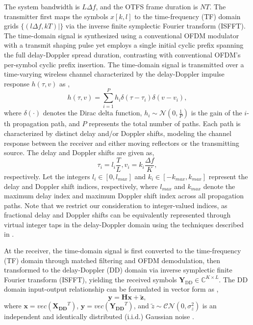 \documentclass{article}
\begin{document}
The system bandwidth is $L\Delta f$, and the OTFS frame duration is $NT$. The transmitter first maps the symbols $x[k,l]$ to the time-frequency (TF) domain grids $\{(l\Delta f, kT)|\}$ via the inverse finite symplectic Fourier transform (ISFFT). The time-domain signal is synthesized using a conventional OFDM modulator with a transmit shaping pulse yet employs a single initial cyclic prefix spanning the full delay-Doppler spread duration, contrasting with conventional OFDM's per-symbol cyclic prefix insertion. The time-domain signal is transmitted over a time-varying wireless channel characterized by the delay-Doppler impulse response $h(\tau, v)$ as \cite{7925924},
\begin{equation}
h(\tau, v) = \sum_{i=1}^P h_i \delta (\tau - {\tau}_i) \delta (v - v_i) ,
\end{equation}
where $\delta(\cdot)$ denotes the Dirac delta function, $h_i \sim \mathcal{N}(0, \frac{1}{P})$ is the gain of the $i$-th propagation path, and $P$ represents the total number of paths. Each path is characterized by distinct delay and/or Doppler shifts, modeling the channel response between the receiver and either moving reflectors or the transmitting source. The delay and Doppler shifts are given as,
\begin{equation}
{\tau}_i = l_i \frac{T}{L}, v_i = k_i \frac{\Delta f}{K},
\end{equation}
respectively. Let the integers $l_i \in [0, l_{max}]$ and $k_i \in [-k_{max}, k_{max}]$ represent the delay and Doppler shift indices, respectively, where $l_{max}$ and $k_{max}$ denote the maximum delay index and maximum Doppler shift index across all propagation paths. Note that we restrict our consideration to integer-valued indices, as fractional delay and Doppler shifts can be equivalently represented through virtual integer taps in the delay-Doppler domain using the techniques described in \cite{6563167, 8377159, 8516353}.

At the receiver, the time-domain signal is first converted to the time-frequency (TF) domain through matched filtering and OFDM demodulation, then transformed to the delay-Doppler (DD) domain via inverse symplectic finite Fourier transform (ISFFT), yielding the received symbols $\bm{Y}_{\text{DD}}\in \mathbb{C}^{K\times L}$. The DD domain input-output relationship can be formulated in vector form as \cite{10264119},
\begin{equation}
\bm{y} = \bm{Hx} + \bm{\tilde{z}},
\label{eq:sys-DD}
\end{equation}
where $\bm{x} = vec(\bm{X_{DD}}^T)$, $\bm{y} = vec(\bm{Y_{DD}}^T)$, and $\tilde{z} \sim \mathcal{CN}(0, \sigma_z^2)$ is an independent and identically distributed (i.i.d.) Gaussian noise \cite{8516353, 10264119, 7925924}.
\end{document}
